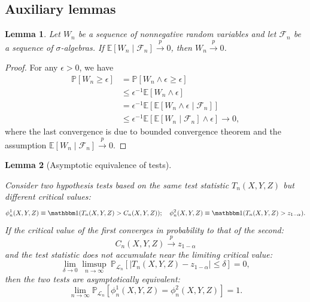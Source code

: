 \documentclass[12pt]{article}
\newtheorem{lemma}{Lemma}
\theoremstyle{definition}
\theoremstyle{remark}
\newcommand{\E}{\mathbb E}								%
\renewcommand{\P}{\mathbb{P}}							%
\newcommand{\indicator}{\mathbbm 1}						%
\newcommand{\convp}{\overset p \rightarrow}             %
\newcommand{\srx}{X}									%
\newcommand{\srz}{Z}									%
\newcommand{\sry}{Y}									%
\newcommand{\law}{\mathcal L}							%
\begin{document}
\subsection{Auxiliary lemmas}

\begin{lemma}
	\label{lem:conditional-expectation-to-unconditional}
	Let $W_n$ be a sequence of nonnegative random variables and let $\mathcal F_n$ be a sequence of $\sigma$-algebras. If $\E[W_n \mid \mathcal{F}_n]\convp 0$, then $ W_n \convp 0$.
\end{lemma}
\begin{proof}
	For any $\epsilon>0$, we have
	\begin{align}
		\P[W_n \geq \epsilon] &= \P[W_n \wedge \epsilon \geq \epsilon] \\
		&\leq \epsilon^{-1} \E[W_n \wedge \epsilon] \\
		&= \epsilon^{-1} \E[\E[W_n \wedge \epsilon\mid \mathcal{F}_n]]\\
		&\leq \epsilon^{-1} \E[\E[W_n \mid \mathcal{F}_n]\wedge \epsilon] \to 0,
	\end{align}
	where the last convergence is due to bounded convergence theorem and the assumption $\E[W_n \mid \mathcal{F}_n]\convp 0$. 
\end{proof}


\begin{lemma}[Asymptotic equivalence of tests] \label{lem:equivalence-lemma}
	
Consider two hypothesis tests based on the same test statistic $T_n(\srx, \sry, \srz)$ but different critical values:
\begin{equation*}
\phi_n^1(\srx, \sry, \srz) \equiv \indicator(T_n(\srx, \sry, \srz) > C_n(\srx, \sry, \srz)); \quad \phi_n^2(\srx, \sry, \srz) \equiv \indicator(T_n(\srx, \sry, \srz) > z_{1-\alpha}). 
\end{equation*}
If the critical value of the first converges in probability to that of the second:
\begin{equation}
C_n(\srx, \sry, \srz) \convp z_{1-\alpha}
\label{eq:convergence-of-critical-value}
\end{equation}
and the test statistic does not accumulate near the limiting critical value:
\begin{equation}
\lim_{\delta \rightarrow 0}\limsup_{n \rightarrow \infty}\ \P_{\law_n}[|T_n(\srx, \sry, \srz)-z_{1-\alpha}| \leq \delta] = 0,
\label{eq:non-accumulation-app}
\end{equation}
then the two tests are asymptotically equivalent:
\begin{equation}
\lim_{n \rightarrow \infty}\P_{\law_n}[\phi_n^{1}(\srx, \sry, \srz) = \phi_n^2(\srx, \sry, \srz)] = 1.
\end{equation}
\end{lemma}
\end{document}

